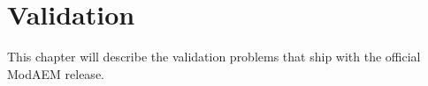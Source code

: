 \chapter{Validation }

This chapter will describe the validation problems that ship with
the official ModAEM release.

